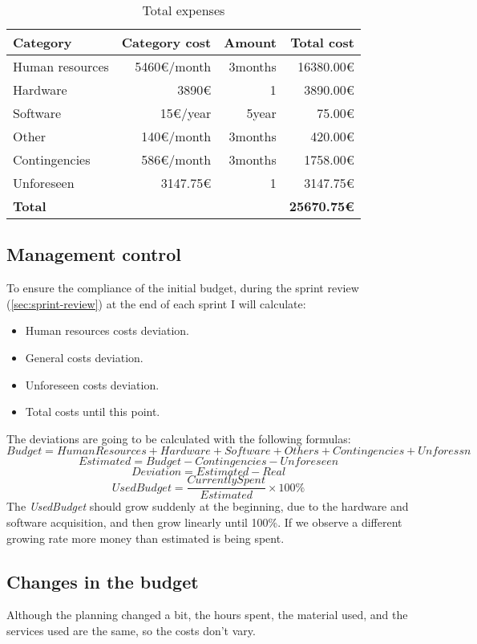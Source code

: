 \begin{table}[ht!]
\centering
\begin{tabular}{lrrr}
    \toprule
    \textbf{Category} & \textbf{Category cost} & \textbf{Amount} & \textbf{Total cost}\\
    \midrule
    Human resources & 5460€/month & 3months & 16380.00€ \\
    Hardware & 3890€ & 1 & 3890.00€ \\
    Software & 15€/year & 5year & 75.00€ \\
    Other & 140€/month & 3months & 420.00€ \\
    Contingencies & 586€/month & 3months & 1758.00€ \\
    Unforeseen & 3147.75€ & 1 & 3147.75€ \\
    \midrule
    \textbf{Total} & & & \textbf{25670.75€} \\
    \bottomrule
\end{tabular}
\caption{Total expenses}
\label{contingency-costs-table}
\end{table}

\newpage
\subsection{Management control}

To ensure the compliance of the initial budget, during the sprint review (\ref{sec:sprint-review}) at the end of each sprint I will calculate:
\begin{itemize}
    \item Human resources costs deviation.
    \item General costs deviation.
    \item Unforeseen costs deviation.
    \item Total costs until this point.
\end{itemize}

The deviations are going to be calculated with the following formulas:
\[Budget=HumanResources + Hardware + Software + Others + Contingencies + Unforessn\]
\[Estimated=Budget-Contingencies-Unforeseen\]
\[Deviation=Estimated-Real\]
\[UsedBudget=\frac{CurrentlySpent}{Estimated}\times100\%\]
The \textit{UsedBudget} should grow suddenly at the beginning, due to the hardware and software acquisition, and then grow linearly until 100\%. If we observe a different growing rate more money than estimated is being spent.

\subsection{Changes in the budget}

Although the planning changed a bit, the hours spent, the material used, and the services used are the same, so the costs don't vary.
